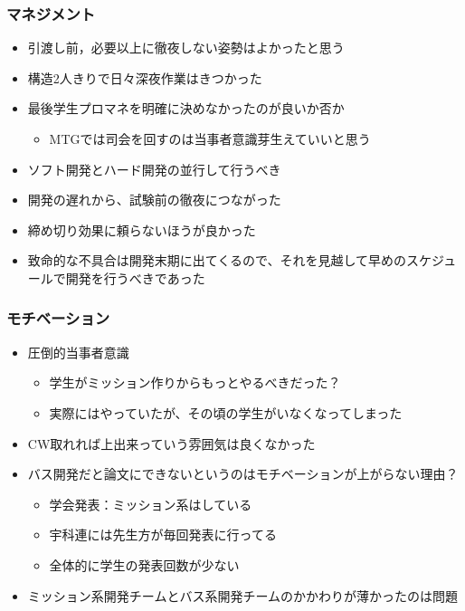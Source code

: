\subsubsection*{マネジメント}
\begin{itemize}
	\item 引渡し前，必要以上に徹夜しない姿勢はよかったと思う
	\item 構造2人きりで日々深夜作業はきつかった
	\item 最後学生プロマネを明確に決めなかったのが良いか否か
	\begin{itemize}
		\item MTGでは司会を回すのは当事者意識芽生えていいと思う
	\end{itemize}
	\item ソフト開発とハード開発の並行して行うべき
	\item 開発の遅れから、試験前の徹夜につながった
	\item 締め切り効果に頼らないほうが良かった
	\item 致命的な不具合は開発末期に出てくるので、それを見越して早めのスケジュールで開発を行うべきであった
\end{itemize}



\subsubsection*{モチベーション}
\begin{itemize}
	\item 圧倒的当事者意識
	\begin{itemize}
		\item 学生がミッション作りからもっとやるべきだった？
		\item 実際にはやっていたが、その頃の学生がいなくなってしまった
	\end{itemize}
	
	\item CW取れれば上出来っていう雰囲気は良くなかった
	\item バス開発だと論文にできないというのはモチベーションが上がらない理由？
	\begin{itemize}
		\item 学会発表：ミッション系はしている
		\item 宇科連には先生方が毎回発表に行ってる
		\item 全体的に学生の発表回数が少ない
	\end{itemize}
	\item ミッション系開発チームとバス系開発チームのかかわりが薄かったのは問題
\end{itemize}


